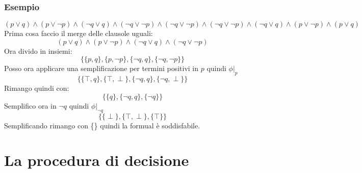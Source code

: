 \documentclass[../main.tex]{subfiles}
\begin{document}
    \subsubsection{Esempio}
    \begin{equation*}
        (p \lor q) \land (p \lor \lnot p) \land (\lnot q \lor q) \land (\lnot q \lor \lnot p) \land (\lnot q \lor \lnot p) \land (\lnot q \lor \lnot p) \land ( \lnot q \lor q )\land (p \lor \lnot p) \land (p \lor q)
    \end{equation*}
    Prima cosa faccio il merge delle clausole uguali:
    \begin{equation*}
        (p \lor q) \land (p \lor \lnot p) \land (\lnot q \lor q) \land (\lnot q \lor \lnot p) 
    \end{equation*}
    Ora divido in insiemi:
    \begin{equation*}
        \{ \{p,q\}, \{p,\lnot p\}, \{\lnot q,q\}, \{\lnot q,\lnot p\} \}
    \end{equation*}
    Posso ora applicare una semplificazione per termini positivi in $p$ quindi $\phi|_p$
    \begin{equation*}
        \{ \{\top,q\}, \{ \top , \perp \}, \{\lnot q,q\}, \{\lnot q,\perp \} \}
    \end{equation*}
    Rimango quindi con:
    \begin{equation*}
        \{ \{q\}, \{\lnot q,q\}, \{\lnot q \} \}
    \end{equation*}
    Semplifico ora in $\lnot q$ quindi $\phi|_{\lnot q}$
    \begin{equation*}
        \{ \{ \perp \}, \{\top , \perp \}, \{\top \} \}
    \end{equation*}
    Semplificando rimango con \{\} quindi la formual è soddisfabile.

    \section{La procedura di decisione}
\end{document}

